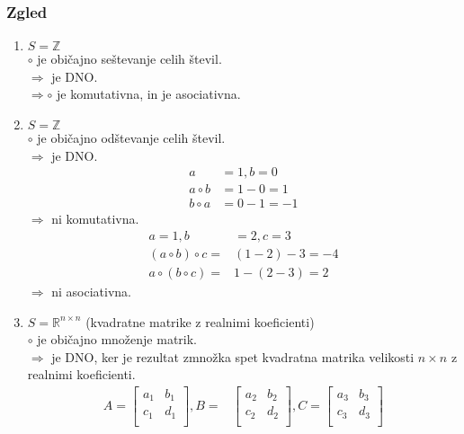 \subsubsection{Zgled}
\begin{enumerate}[label=\alph*)]
    \item $S = \mathbb{Z}$ \\ $\circ$ je običajno seštevanje celih števil. \\ $\Rightarrow$ je DNO. \\ $\Rightarrow \circ$ je komutativna, in je asociativna.
    \item $S = \mathbb{Z}$ \\ $\circ$ je običajno odštevanje celih števil. \\ $\Rightarrow$ je DNO.
    \begin{align*}
        a &= 1, b = 0 \\
        a \circ b &= 1 - 0 = 1 \\
        b \circ a &= 0 - 1 = -1   
    \end{align*}
    $\Rightarrow$ ni komutativna.
    \begin{align*}
        a = 1, b &= 2, c = 3 \\
        (a \circ b) \circ c = & (1 - 2) - 3 = -4 \\
        a \circ (b \circ c) = & 1 - (2 - 3) = 2   
    \end{align*}
    $\Rightarrow$ ni asociativna.
    \item $S = \mathbb{R}^{n \times n}$ (kvadratne matrike z realnimi koeficienti) \\ $\circ$ je običajno množenje matrik. \\ $\Rightarrow$ je DNO, ker je rezultat zmnožka spet kvadratna matrika velikosti $n \times n$ z realnimi koeficienti.
    \begin{align*}
        A = 
        \begin{bmatrix}
            a_1 & b_1 \\
            c_1 & d_1 \\
        \end{bmatrix}, 
        B = &
        \begin{bmatrix}
            a_2 & b_2 \\
            c_2 & d_2 \\
        \end{bmatrix},
        C = 
        \begin{bmatrix}
            a_3 & b_3 \\
            c_3 & d_3 \\

\end{bmatrix}
\end{align*}
\end{enumerate}
